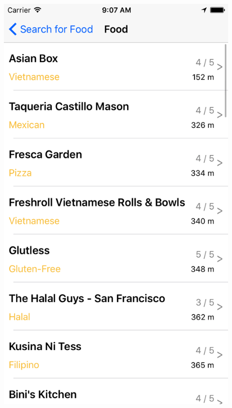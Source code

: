 \documentclass{beamer}
\begin{document}
\begin{frame}
\begin{columns}
\begin{column}{0.3\textwidth}
    \end{column}
    \begin{column}{0.3\textwidth}  %
        \begin{center}
            \includegraphics[scale=0.14]{foodTable}
        \end{center}
    \end{column}
    \begin{column}{0.3\textwidth}  %
        \begin{center}

\end{center}
\end{column}
\end{columns}
\end{frame}
\end{document}

